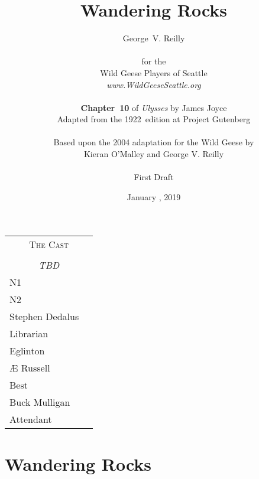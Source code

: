 


\title{\Huge Wandering Rocks}
\author{George~V. Reilly\\
\\
{\small for the}\\
Wild Geese Players of Seattle\\
{\textit{www.WildGeeseSeattle.org}}\\
\\
{\small \textbf{Chapter~10} of \textit{Ulysses} by James Joyce}\\
{\small Adapted from the 1922~edition at Project Gutenberg}
\\
\\
{\small Based upon the 2004 adaptation for the Wild Geese by}\\
{\small Kieran O'Malley and George V. Reilly}\\
\\
{\small First Draft}}
\date{January , 2019}
\raggedbottom



\maketitle
\thispagestyle{empty}
\pagebreak

\begin{tabular}{lp{10cm}}
    \multicolumn{2}{c}{\Large \textsc{The Cast}} \\
\\
    \multicolumn{2}{c}{\large \textit{TBD}} \\
N1 \\  %
N2 \\  %
Stephen Dedalus \\
Librarian \\
Eglinton \\
Æ Russell \\
Best \\
Buck Mulligan \\
Attendant \\
\end{tabular}

\thispagestyle{empty}
\newpage


\setcounter{page}{1}

\section*{Wandering Rocks}




